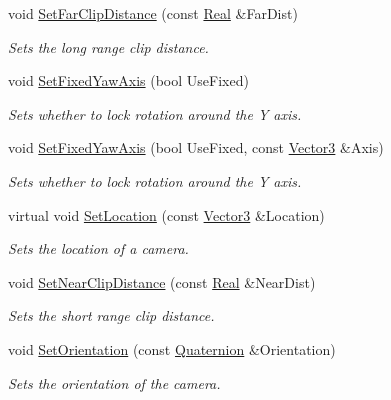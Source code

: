 \begin{DoxyCompactItemize}
void \hyperlink{classMezzanine_1_1Camera_af24424a1670ae6b10e9a61fbaf9fd23a}{SetFarClipDistance} (const \hyperlink{namespaceMezzanine_a726731b1a7df72bf3583e4a97282c6f6}{Real} \&FarDist)
\begin{DoxyCompactList}\small\item\em Sets the long range clip distance. \item\end{DoxyCompactList}\item 
void \hyperlink{classMezzanine_1_1Camera_abd19c7667593b8ea0bff576ae3a451ba}{SetFixedYawAxis} (bool UseFixed)
\begin{DoxyCompactList}\small\item\em Sets whether to lock rotation around the Y axis. \item\end{DoxyCompactList}\item 
void \hyperlink{classMezzanine_1_1Camera_a2ffb9eca37630a8d26669aab8668bce3}{SetFixedYawAxis} (bool UseFixed, const \hyperlink{classMezzanine_1_1Vector3}{Vector3} \&Axis)
\begin{DoxyCompactList}\small\item\em Sets whether to lock rotation around the Y axis. \item\end{DoxyCompactList}\item 
virtual void \hyperlink{classMezzanine_1_1Camera_afdc236c2c875035c8a11473350d0d17a}{SetLocation} (const \hyperlink{classMezzanine_1_1Vector3}{Vector3} \&Location)
\begin{DoxyCompactList}\small\item\em Sets the location of a camera. \item\end{DoxyCompactList}\item 
void \hyperlink{classMezzanine_1_1Camera_a638201c94b28ca0acc406b11f166e751}{SetNearClipDistance} (const \hyperlink{namespaceMezzanine_a726731b1a7df72bf3583e4a97282c6f6}{Real} \&NearDist)
\begin{DoxyCompactList}\small\item\em Sets the short range clip distance. \item\end{DoxyCompactList}\item 
void \hyperlink{classMezzanine_1_1Camera_af502b9c47b1acce46e1482ce049320eb}{SetOrientation} (const \hyperlink{classMezzanine_1_1Quaternion}{Quaternion} \&Orientation)
\begin{DoxyCompactList}\small\item\em Sets the orientation of the camera. \item\end{DoxyCompactList}\item 

\end{DoxyCompactItemize}
